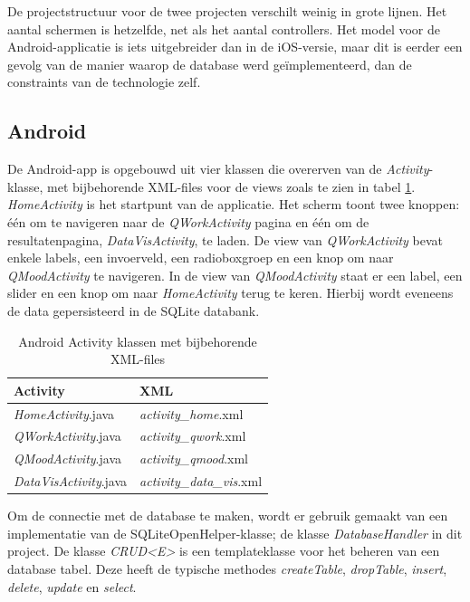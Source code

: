 De projectstructuur voor de twee projecten verschilt weinig in grote lijnen. Het aantal schermen is hetzelfde, net als het aantal controllers. Het model voor de Android-applicatie is iets uitgebreider dan in de iOS-versie, maar dit is eerder een gevolg van de manier waarop de database werd ge\"implementeerd, dan de constraints van de technologie zelf.


\subsection{Android}

De Android-app is opgebouwd uit vier klassen die overerven van de \textit{Activity}-klasse, met bijbehorende XML-files voor de views zoals te zien in tabel \ref{tab:android_activities}. \textit{HomeActivity} is het startpunt van de applicatie. Het scherm toont twee knoppen: \'e\'en om te navigeren naar de \textit{QWorkActivity} pagina en \'e\'en om de resultatenpagina, \textit{DataVisActivity}, te laden. De view van \textit{QWorkActivity} bevat enkele labels, een invoerveld, een radioboxgroep en een knop om naar \textit{QMoodActivity} te navigeren. In de view van \textit{QMoodActivity} staat er een label, een slider en een knop om naar \textit{HomeActivity} terug te keren. Hierbij wordt eveneens de data gepersisteerd in de SQLite databank.

\begin{table}[h]
\caption{Android Activity klassen met bijbehorende XML-files}
\begin{center}
	\begin{tabular}{ l l } %
		\hline
		\textbf{Activity}								&	\textbf{XML}											\\
		\hline
		\textit{HomeActivity}.java			&	\textit{activity\_home}.xml 			\\
		\textit{QWorkActivity}.java			&	\textit{activity\_qwork}.xml			\\
		\textit{QMoodActivity}.java 		&	\textit{activity\_qmood}.xml 			\\
		\textit{DataVisActivity}.java		&	\textit{activity\_data\_vis}.xml	\\
		\hline
	\end{tabular}
\end{center}
\label{tab:android_activities}
\end{table}

Om de connectie met de database te maken, wordt er gebruik gemaakt van een implementatie van de SQLiteOpenHelper-klasse; de klasse \textit{DatabaseHandler} in dit project. De klasse \textit{CRUD<E>} is een templateklasse voor het beheren van een database tabel. Deze heeft de typische methodes \textit{createTable}, \textit{dropTable}, \textit{insert}, \textit{delete}, \textit{update} en \textit{select}.

